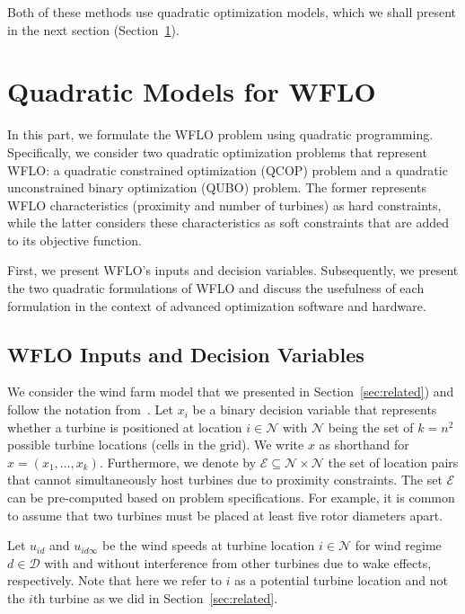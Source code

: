 \documentclass[preprint,12pt]{elsarticle}
\begin{document}
Both of these methods use 
quadratic optimization models, which we shall present in the next section (Section~\ref{sec:QUBO4WFLO}).



\section{Quadratic Models for WFLO}
\label{sec:QUBO4WFLO}

In this part, 
we formulate the WFLO problem
using quadratic programming. Specifically, we consider two
quadratic optimization problems that represent WFLO: a
quadratic constrained optimization (QCOP) problem and 
a quadratic unconstrained binary optimization (QUBO) problem. 
The former represents WFLO characteristics (proximity and number of turbines)
as hard constraints, while the latter considers these characteristics as soft constraints that are added to its objective function.

First, we present WFLO's inputs and decision variables.
Subsequently, we present the two quadratic formulations of WFLO
and discuss the usefulness of each formulation in the context
of advanced optimization software and hardware. 

\subsection{WFLO Inputs and Decision Variables} We consider the wind farm model that we presented in Section~\ref{sec:related}) and follow the notation from~\cite{Zhang2014}. Let $x_i$ be a binary decision variable that represents whether a 
turbine is positioned at location 
$i \in \mathcal{N}$ with $\mathcal{N}$ being the set 
of $k = n^2$ possible turbine locations (cells in the grid). We 
write $x$ as shorthand for $x = (x_1,\ldots, x_k)$. Furthermore,
we denote by $\mathcal{E} \subseteq \mathcal{N}\times \mathcal{N}$
the set of location pairs that cannot simultaneously host turbines 
due to proximity constraints. The set $\mathcal{E}$ can be pre-computed 
based on problem specifications. For example,
it is common to assume that two turbines must be placed at least five rotor diameters apart. 

Let $u_{id}$ and $u_{id\infty}$ 
be the wind speeds at turbine location $i \in \mathcal{N}$ for wind regime $d \in \mathcal{D}$
with and without interference from other turbines due to wake effects, respectively. 
Note that here we refer to $i$ as a potential turbine location and not the $i$th turbine as we did in Section~\ref{sec:related}.
 
\end{document}
